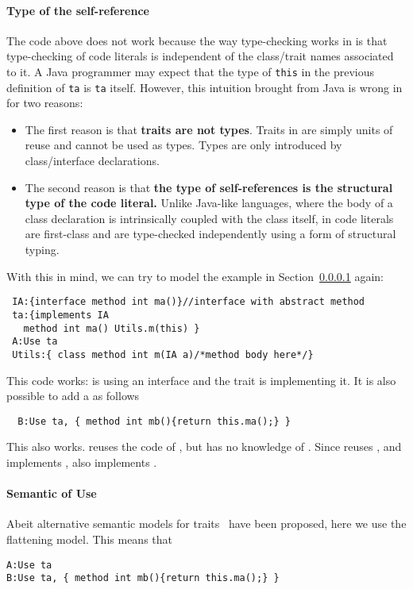 \paragraph{Type of the self-reference} The code above does not work
because the way type-checking works in \name is that type-checking of 
code literals is independent of the class/trait names associated to
it. A Java programmer may expect that the type of \lstinline{this} 
in the previous definition of \lstinline{ta} is \lstinline{ta}
itself. However, this intuition brought from Java is wrong in \name
for two reasons:

\begin{itemize}

\item The first reason is that {\bf traits are not types}. Traits in
  \name are simply units of reuse and cannot be used as types. Types
  are only introduced by class/interface declarations.

\item The second reason is that {\bf the type of self-references is the structural type of the
    code literal.} Unlike Java-like languages, where the body of a
  class declaration is intrinsically coupled with the class itself, in
  \name code literals are first-class and are type-checked independently
  using a form of structural typing. 
\end{itemize}

With this in mind, we can try to model the example in Section~\ref{} again:

\begin{lstlisting}
 IA:{interface method int ma()}//interface with abstract method
 ta:{implements IA
   method int ma() Utils.m(this) }
 A:Use ta
 Utils:{ class method int m(IA a)/*method body here*/}
\end{lstlisting}

This code works: \Q@Utils@ is using an interface \Q@IA@ and the trait \Q@ta@
is implementing it. It is also possible to add a \Q@B@ as follows
\begin{lstlisting}
  B:Use ta, { method int mb(){return this.ma();} }
\end{lstlisting}
This also works.  \Q@B@ reuses the code of \Q@ta@, but has no knowledge of \Q@A@.
Since \Q@B@ reuses \Q@ta@, and \Q@ta@ implements \Q@IA@, also \Q@B@ implements \Q@IA@. 

\paragraph*{Semantic of Use}
Abeit alternative semantic models for traits~\cite{} have been proposed,
here we use the flattening model.
This means that 
\begin{lstlisting}
A:Use ta
B:Use ta, { method int mb(){return this.ma();} }
\end{lstlisting}
 
